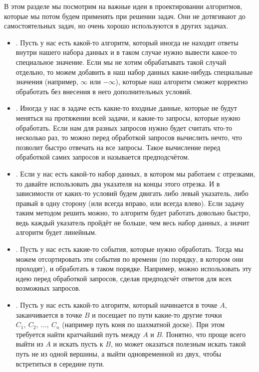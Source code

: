 В этом разделе мы посмотрим на важные идеи в проектировании алгоритмов, которые мы потом будем применять при решении задач. Они не дотягивают до самостоятельных задач, но очень хорошо используются в других задачах.

\begin{itemize}
    \item {}. Пусть у нас есть какой-то алгоритм, который иногда не находит ответы внутри нашего набора данных и в таком случае нужно вывести какое-то специальное значение. Если мы не хотим обрабатывать такой случай отдельно, то можем добавить в наш набор данных какие-нибудь специальные значения (например, $\infty$ или $-\infty$), которые наш алгоритм сможет корректно обработать без внесения в него дополнительных условий.
    \item {}. Иногда у нас в задаче есть какие-то входные данные, которые не будут меняться на протяжении всей задачи, и какие-то запросы, которые нужно обработать. Если нам для разных запросов нужно будет считать что-то несколько раз, то можно перед обработкой запросов вычислить нечто, что позволит быстро отвечать на все запросы. Такое вычисление перед обработкой самих запросов и называется предподсчётом.
    \item {}. Если у нас есть какой-то набор данных, в котором мы работаем с отрезками, то давайте использовать два указателя на концы этого отрезка. И в зависимости от каких-то условий будем двигать либо левый указатель, либо правый в одну сторону (или всегда вправо, или всегда влево). Если задачу таким методом решить можно, то алгоритм будет работать довольно быстро, ведь каждый указатель пройдёт не больше, чем весь набор данных, а значит алгоритм будет линейным.
    \item {}. Пусть у нас есть какие-то события, которые нужно обработать. Тогда мы можем отсортировать эти события по времени (по порядку, в котором они проходят), и обработать в таком порядке. Например, можно использовать эту идею перед обработкой запросов, сделав предподсчёт ответов для всех возможных запросов.
    \item {}. Пусть у нас есть какой-то алгоритм, который начинается в точке $A$, заканчивается в точке $B$ и посещает по пути какие-то другие точки $C_1,\ C_2,\ \ldots,\ C_n$ (например путь коня по шахматной доске). При этом требуется найти кратчайший путь между $A$ и $B$. Понятно, что проще всего выйти из $A$ и искать пусть к $B$, но может оказаться полезным искать такой путь не из одной вершины, а выйти одновременной из двух, чтобы встретиться в середине пути.
\end{itemize}
